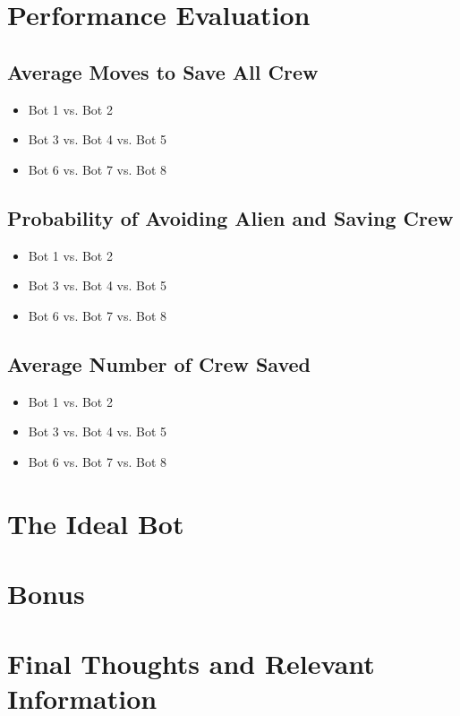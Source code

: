 \documentclass[11pt]{article}
\begin{document}
\section{Performance Evaluation}

\subsection{Average Moves to Save All Crew}

\begin{itemize}
    \item Bot 1 vs. Bot 2
    \item Bot 3 vs. Bot 4 vs. Bot 5
    \item Bot 6 vs. Bot 7 vs. Bot 8
\end{itemize}

\subsection{Probability of Avoiding Alien and Saving Crew}

\begin{itemize}
    \item Bot 1 vs. Bot 2
    \item Bot 3 vs. Bot 4 vs. Bot 5
    \item Bot 6 vs. Bot 7 vs. Bot 8
\end{itemize}

\subsection{Average Number of Crew Saved}

\begin{itemize}
    \item Bot 1 vs. Bot 2
    \item Bot 3 vs. Bot 4 vs. Bot 5
    \item Bot 6 vs. Bot 7 vs. Bot 8
\end{itemize}


\section{The Ideal Bot}



\section{Bonus}



\section{Final Thoughts and Relevant Information}
\end{document}
